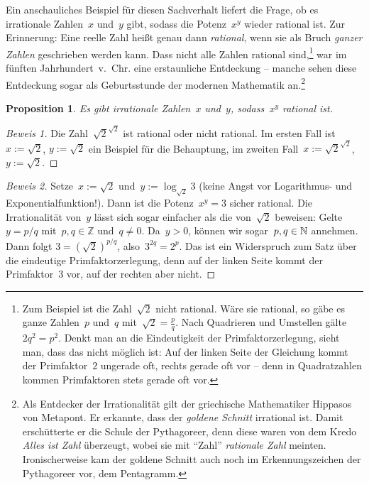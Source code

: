 \documentclass[twoside]{../zirkelblatt}
\newcommand{\ZZ}{\mathbb{Z}}
\theoremstyle{definition}
\theoremstyle{plain}
\newtheorem{prop}[defn]{Proposition}
\theoremstyle{remark}
\begin{document}
Ein anschauliches Beispiel für diesen Sachverhalt liefert die Frage, ob
es irrationale Zahlen~$x$ und~$y$ gibt, sodass die Potenz~$x^y$ wieder rational ist.
Zur Erinnerung: Eine reelle Zahl heißt genau dann \emph{rational}, wenn sie
als Bruch \emph{ganzer Zahlen} geschrieben werden kann. Dass nicht alle Zahlen
rational sind,\footnote{Zum Beispiel ist die Zahl~$\sqrt{2}$ nicht rational.
Wäre sie rational, so gäbe es ganze Zahlen~$p$ und~$q$ mit~$\sqrt{2} =
\frac{p}{q}$. Nach Quadrieren und Umstellen gälte~$2q^2 = p^2$. Denkt man an die
Eindeutigkeit der Primfaktorzerlegung, sieht man, dass das nicht möglich ist:
Auf der linken Seite der Gleichung kommt der Primfaktor~$2$ ungerade oft,
rechts gerade oft vor -- denn in Quadratzahlen kommen Primfaktoren stets
gerade oft vor.}
war im fünften Jahrhundert~v.~Chr. eine erstaunliche Entdeckung
-- manche sehen diese Entdeckung sogar als Geburtsstunde der modernen
Mathematik an.\footnote{Als Entdecker der Irrationalität gilt der griechische
Mathematiker Hippasos von
Metapont. Er erkannte, dass der \emph{goldene Schnitt} irrational ist. Damit
erschütterte er die Schule der Pythagoreer, denn diese waren von dem Kredo
\emph{Alles ist Zahl} überzeugt, wobei sie mit "`Zahl"' \emph{rationale Zahl}
meinten. Ironischerweise kam der goldene Schnitt auch noch im Erkennungszeichen der
Pythagoreer vor, dem Pentagramm.}

\begin{prop}Es gibt irrationale Zahlen~$x$ und~$y$, sodass~$x^y$ rational ist.
\end{prop}
\begin{proof}[Beweis 1] Die Zahl~$\sqrt{2}^{\sqrt{2}}$ ist rational oder nicht
rational. Im ersten Fall ist~$x := \sqrt{2}$, $y := \sqrt{2}$ ein Beispiel für
die Behauptung, im zweiten Fall~$x := \sqrt{2}^{\sqrt{2}}$, $y := \sqrt{2}$.
\end{proof}
\begin{proof}[Beweis 2] Setze~$x := \sqrt{2}$ und~$y := \log_{\sqrt{2}} 3$
(keine Angst vor Logarithmus- und Exponentialfunktion!).
Dann ist die Potenz~$x^y = 3$ sicher rational. Die Irrationalität von~$y$ lässt sich
sogar einfacher als die von~$\sqrt{2}$ beweisen:
Gelte~$y = p/q$ mit~$p, q \in \ZZ$ und~$q \neq 0$. Da~$y > 0$, können wir
sogar~$p, q \in \mathbb{N}$ annehmen.
Dann folgt $3 = (\sqrt{2})^{p/q}$, also~$3^{2q} = 2^p$. Das ist ein
Widerspruch zum Satz über die eindeutige Primfaktorzerlegung, denn auf der linken
Seite kommt der Primfaktor~$3$ vor, auf der rechten aber nicht.
\end{proof}
\end{document}
